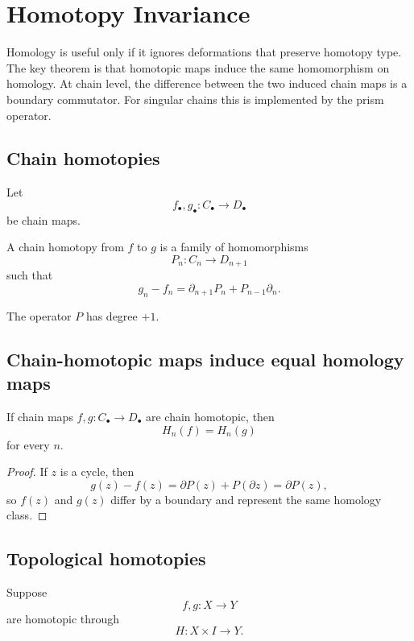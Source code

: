 ﻿\chapter{Homotopy Invariance}
\label{ch:viii20-homotopy-invariance}

Homology is useful only if it ignores deformations that preserve homotopy type.
The key theorem is that homotopic maps induce the same homomorphism on homology.
At chain level, the difference between the two induced chain maps is a boundary
commutator.  For singular chains this is implemented by the prism operator.

\section{Chain homotopies}

Let
\[
f_\bullet,g_\bullet:C_\bullet\to D_\bullet
\]
be chain maps.

\begin{definition}
\label{def:viii20-chain-homotopy}
A chain homotopy from \(f\) to \(g\) is a family of homomorphisms
\[
P_n:C_n\to D_{n+1}
\]
such that
\[
g_n-f_n
=
\partial_{n+1}P_n+P_{n-1}\partial_n.
\]
\end{definition}

The operator \(P\) has degree \(+1\).

\section{Chain-homotopic maps induce equal homology maps}

\begin{theorem}
\label{thm:viii20-chain-homotopy-invariance}
If chain maps \(f,g:C_\bullet\to D_\bullet\) are chain homotopic, then
\[
H_n(f)=H_n(g)
\]
for every \(n\).
\end{theorem}

\begin{proof}
If \(z\) is a cycle, then
\[
g(z)-f(z)
=
\partial P(z)+P(\partial z)
=
\partial P(z),
\]
so \(f(z)\) and \(g(z)\) differ by a boundary and represent the same homology
class.
\end{proof}

\section{Topological homotopies}

Suppose
\[
f,g:X\to Y
\]
are homotopic through
\[
H:X\times I\to Y.
\]

